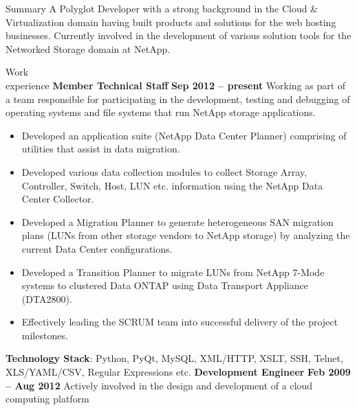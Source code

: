 \documentclass{resume}
\author{Sreejith Kesavan}
\begin{document}
\maketitle

\begin{category}{Summary}
  \citemnobullet A Polyglot Developer with a strong background in the Cloud \& Virtualization 
  domain having built products and solutions for the web hosting businesses. 
  Currently involved in the development of various solution tools for the 
  Networked Storage domain at NetApp.
\end{category}


\begin{category}{Work \\experience}
  \citemnobullet \textbf{Member Technical Staff} \hfill \textbf{Sep 2012 -- present}
  \citemnobullet Working as part of a team responsible for participating in the development, 
  testing and debugging of operating systems and file systems that run NetApp storage applications.
  \begin{itemize}
  \item Developed an application suite (NetApp Data Center Planner) comprising of utilities that 
  assist in data migration.
  \item Developed various data collection modules to collect Storage Array, Controller, Switch, Host, 
  LUN etc. information using the NetApp Data Center Collector.
  \item Developed a Migration Planner to generate heterogeneous SAN migration plans (LUNs from 
  other storage vendors to NetApp storage) by analyzing the current Data Center configurations.
  \item Developed a Transition Planner to migrate LUNs from NetApp 7-Mode systems to clustered
  Data ONTAP using Data Transport Appliance (DTA2800).
  \item Effectively leading the SCRUM team into successful delivery of the project milestones.
  \end{itemize}
  \citemnobullet \textbf{Technology Stack}: Python, PyQt, MySQL, XML/HTTP, XSLT, SSH,
  Telnet, XLS/YAML/CSV, Regular Expressions etc.
  \citemnobullet \textbf{Development Engineer} \hfill \textbf{Feb 2009 -- Aug 2012}
  \citemnobullet Actively involved in the design and development of a cloud computing platform 

\end{category}
\end{document}
